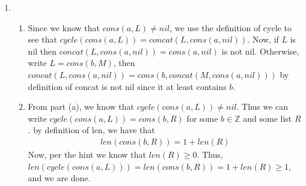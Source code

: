 \documentclass[12pt]{article}
\theoremstyle{definitionstyle}
\def\mbb#1{\mathbb{#1}}
\def\bZ{\mbb{Z}}
\begin{document}
\begin{enumerate}[leftmargin=\labelsep]
        \item \begin{enumerate}
            \item Since we know that $cons(a,L) \neq nil$, we use the definition of cycle to see that $cycle(cons(a,L)) = concat(L, cons(a,nil))$. Now, if $L$ is nil then $concat(L, cons(a, nil)) = cons(a, nil)$ is not nil. Otherwise, write $L = cons(b, M)$, then $concat(L, cons(a, nil)) = cons(b, concat(M, cons(a, nil)))$ by definition of concat is not nil since it at least contains $b$. 
            \item From part (a), we know that $cycle(cons(a, L)) \neq nil$. Thus we can write $cycle(cons(a, L)) = cons(b, R)$ for some $b \in \bZ$ and some list $R$. by definition of len, we have that
            \[\begin{aligned}
                len(cons(b, R)) = 1 + len(R)
            \end{aligned}\]
            Now, per the hint we know that $len(R) \geq 0$. Thus, $len(cycle(cons(a, L))) = len(cons(b, R)) = 1 + len(R) \geq 1$, and we are done. 
        \end{enumerate}
    \end{enumerate}
\end{document}
